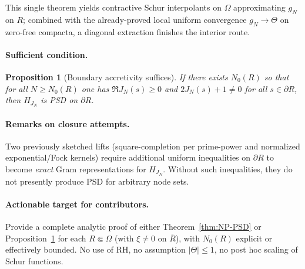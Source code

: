 \documentclass[11pt]{article}
\newtheorem{proposition}{Proposition}
\theoremstyle{remark}
\begin{document}
\noindent
This single theorem yields contractive Schur interpolants on $\Omega$ approximating $g_N$ on $R$; combined with the already-proved local uniform convergence $g_N\to \Theta$ on zero-free compacta, a diagonal extraction finishes the interior route.

\paragraph{Sufficient condition.}
\begin{proposition}[Boundary accretivity suffices]\label{prop:accretive}
If there exists $N_0(R)$ so that for all $N\ge N_0(R)$ one has $\Re J_N(s)\ge 0$ and $2J_N(s)+1\ne 0$ for all $s\in \partial R$, then $H_{J_N}$ is PSD on $\partial R$.
\end{proposition}

\paragraph{Remarks on closure attempts.} Two previously sketched lifts (square-completion per prime-power and normalized exponential/Fock kernels) require additional uniform inequalities on $\partial R$ to become \emph{exact} Gram representations for $H_{J_N}$. Without such inequalities, they do not presently produce PSD for arbitrary node sets.

\paragraph{Actionable target for contributors.}
Provide a complete analytic proof of either Theorem~\ref{thm:NP-PSD} or Proposition~\ref{prop:accretive} for each $R\Subset\Omega$ (with $\xi\ne 0$ on $\overline R$), with $N_0(R)$ explicit or effectively bounded. No use of RH, no assumption $|\Theta|\le 1$, no post hoc scaling of Schur functions.
\end{document}
